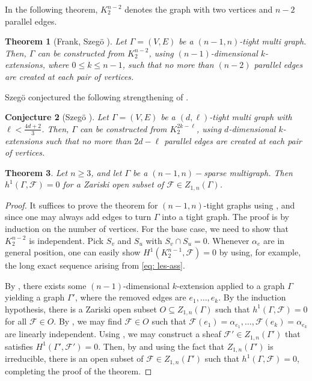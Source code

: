 \documentclass{article}
\newtheorem{theorem}{Theorem}[section]
\newtheorem{conjecture}[theorem]{Conjecture}
\theoremstyle{definition}
\theoremstyle{remark}
\begin{document}
In the following theorem, $K_{2}^{n-2}$ denotes the graph with two vertices and $n-2$ parallel edges. 
\begin{theorem}[Frank, Szegö \cite{frank2003constructive}]\label{thm: FrankSzegö}
Let $\Gamma=(V, E)$ be a $(n-1, n)$-tight multi graph. Then, $\Gamma$ can be constructed from $K_{2}^{n-2}$, using $(n-1)$-dimensional $k$-extensions, where $0\leq k\leq n-1$, such that no more than $(n-2)$ parallel edges are created at each pair of vertices. 
\end{theorem}

Szegö conjectured the following strengthening of .
\begin{conjecture}[Szegö \cite{SZEGO20061211}]\label{Szegö conjecture}
Let $\Gamma=(V, E)$ be a $(d, \ell)$-tight multi graph with $\ell < \frac{4d+2}{3}$. Then, $\Gamma$ can be constructed from $K_{2}^{2k-\ell}$, using $d$-dimensional $k$-extensions such that no more than $2d - \ell$ parallel edges are created at each pair of vertices. 
\end{conjecture}

\begin{theorem}\label{thm: main_thm_ass_sheaves}
    Let $n\geq 3$, and let $\Gamma$ be a $(n-1, n)-$sparse multigraph. Then $h^{1}(\Gamma, \mathcal{F}) = 0$ for a Zariski open subset of $\mathcal{F} \in Z_{1, n}(\Gamma)$. 
\end{theorem}
\begin{proof}
    It suffices to prove the theorem for $(n-1, n)$-tight graphs using , and since one may always add edges to turn $\Gamma$ into a tight graph.
    The proof is by induction on the number of vertices. For the base case, we need to show that $K^{n-2}_{2}$ is independent. Pick $S_v$ and $S_{u}$ with $S_v\cap S_u = 0$. Whenever $\alpha_{e}$ are in general position, one can easily show $H^{1}(K^{n-1}_{2}, \mathcal{F}) = 0$ by using, for example, the long exact sequence arising from \eqref{eq: les-ass}.
    
       By , there exists some
     $(n-1)$-dimensional $k$-extension applied to a graph $\Gamma$ yielding a graph $\Gamma'$, where the removed edges are $e_1, \dots, e_{k}$. By the induction hypothesis, there is a Zariski open subset $O \subseteq Z_{1, n}(\Gamma)$ such that $h^{1}(\Gamma, \mathcal{F}) =0$ for all $\mathcal{F}\in O$. By , we may find $\mathcal{F}\in O$ such that $\mathcal{F}(e_1) = \alpha_{e_1}, \dots, \mathcal{F}(e_k) = \alpha_{e_k}$ are linearly independent. Using , we may construct a sheaf $\mathcal{F}' \in Z_{1,n}(\Gamma')$ that satisfies $H^{1}(\Gamma', \mathcal{F'}) = 0$. Then, by  and using the fact that $Z_{1,n}(\Gamma')$ is irreducible, there is an open subset of $\mathcal{F}\in Z_{1, n}(\Gamma')$ such that $h^{1}(\Gamma, \mathcal{F}) = 0$, completing the proof of the theorem. 
\end{proof}
\end{document}
